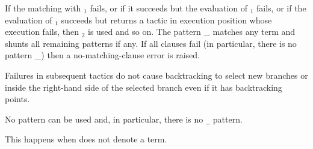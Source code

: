 If the matching with {\cpattern}$_1$ fails, or if it succeeds but the
evaluation of {\tacexpr}$_1$ fails, or if the evaluation of
{\tacexpr}$_1$ succeeds but returns a tactic in execution position
whose execution fails, then {\cpattern}$_2$ is used and so on.  The
pattern {\_} matches any term and shunts all remaining patterns if
any. If all clauses fail (in particular, there is no pattern {\_})
then a no-matching-clause error is raised.

Failures in subsequent tactics do not cause backtracking to select new
branches or inside the right-hand side of the selected branch even if
it has backtracking points.

\begin{ErrMsgs}

\item {}

  No pattern can be used and, in particular, there is no {\tt \_} pattern.

\item {}

  This happens when {\tacexpr} does not denote a term.

\end{ErrMsgs}

